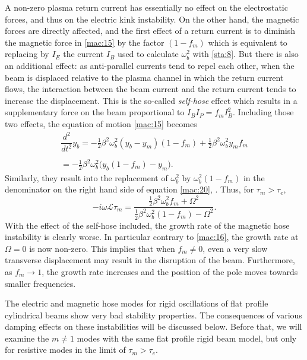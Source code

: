 \documentclass [12pt,a4paper,     ]{report} %
\newcommand{\Oh}{\tfrac{1}{2}}        %
\begin{document}
	A non-zero plasma return current has essentially no effect on the electrostatic forces, and thus on the electric kink instability.  On the other hand, the magnetic forces are directly affected, and the first effect of a return current is to diminish the magnetic force in \eqref{mac:15} by the factor $(1-f_m)$ which is equivalent to replacing by $I_E$ the current $I_B$ used to calculate $\omega_b^2$  with \eqref{sta:8}.  But there is also an additional effect: as anti-parallel currents tend to repel each other, when the beam is displaced relative to the plasma channel in which the return current flows, the interaction between the beam current and the return current tends to increase the displacement.  This is the so-called \emph{self-hose} effect which results in a supplementary force on the beam proportional to $I_BI_P = f_m I_B^2$.  Including those two effects, the equation of motion \eqref{mac:15} becomes
%
\begin{equation}\label{mac:23} %
\begin{array}{r}
    \dfrac{d^2}{dt^2} y_b = - \Oh \beta^2 \omega_b^2 (y_b - y_m) (1-f_m)
                            + \Oh \beta^2 \omega_b^2        y_m     f_m \\
                         ~~\\
                          = - \Oh \beta^2 \omega_b^2 
                              \bigl(y_b(1-f_m) - y_m\bigr).
\end{array}
\end{equation}
%
Similarly, they result into the replacement of $\omega_b^2$  by $\omega_b^2(1-f_m)$ in the denominator on the right hand side of  equation \eqref{mac:20}, \cite{UHM--1981-}.  Thus, for $\tau_m>\tau_e$,
%
\begin{equation}\label{mac:24} %
      -i\omega\mathcal{L}\tau_m = 
        \frac{\Oh\beta^2\omega_b^2f_m +\Omega^2}
             {\Oh\beta^2\omega_b^2(1-f_m) - \Omega^2}.
\end{equation}
%
With the effect of the self-hose included, the growth rate of the magnetic hose instability is clearly worse.  In particular contrary to \eqref{mac:16}, the growth rate at $\Omega=0$ is now non-zero.  This implies that when $f_m \neq 0$, even a very slow transverse displacement may result in the disruption of the beam.  Furthermore, as $f_m \rightarrow 1$, the growth rate increases and the position of the pole moves towards smaller frequencies.

	The electric and magnetic hose modes for rigid oscillations of flat profile cylindrical beams show very bad stability properties.  The consequences of various damping effects on these instabilities will be discussed below.  Before that, we will examine the $m\neq 1$ modes with the same flat profile rigid beam model, but only for resistive modes in the limit of $\tau_m>\tau_e$.
\end{document}
